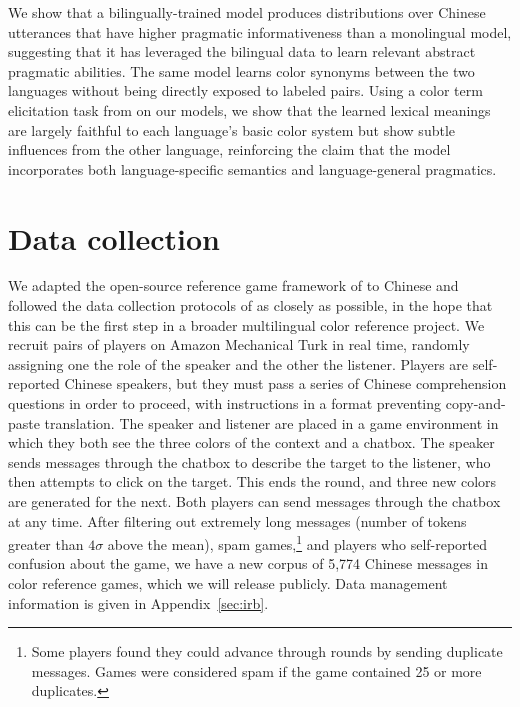 \documentclass[11pt,a4paper]{article}
\renewcommand{\|}{\mid}
\begin{document}
We show that a bilingually-trained model produces distributions over Chinese utterances that have higher pragmatic informativeness than a monolingual model, 
suggesting that it has leveraged the bilingual data to learn relevant abstract pragmatic abilities. The same model learns color synonyms between the two languages without being directly exposed to labeled pairs. Using a color term elicitation task from \citet{BerlinKay1969} on our models, we show that the learned lexical meanings are largely faithful to each language's basic color system but show subtle influences from the other language, reinforcing the claim that the model incorporates both language-specific semantics and language-general pragmatics.


\section{Data collection} \label{sec:data}

We adapted the open-source reference game framework of \citet{Hawkins15_RealTimeWebExperiments} to Chinese and followed the data collection protocols of \citet{Monroe2017} as closely as possible, in the hope that this can be the first step in a broader multilingual color reference project. We recruit pairs of players on Amazon Mechanical Turk in real time, randomly assigning one the role of the speaker and the other the listener. Players are self-reported Chinese speakers, but they must pass a series of Chinese comprehension questions in order to proceed, with instructions in a format preventing copy-and-paste translation. The speaker and listener are placed in a game environment in which they both see the three colors of the context and a chatbox. The speaker sends messages through the chatbox to describe the target to the listener, who then attempts to click on the target. This ends the round, and three new colors are generated for the next. Both players can send messages through the chatbox at any time. After filtering out extremely long messages (number of tokens greater than $4\sigma$ above the mean), spam games,\footnote{Some players found they could advance through rounds by sending duplicate messages. Games were considered spam if the game contained 25 or more duplicates.} and players who self-reported confusion about the game, we have a new corpus of 5,774 Chinese messages in color reference games, which we will release publicly. Data management information is given in Appendix~\ref{sec:irb}.
\end{document}
